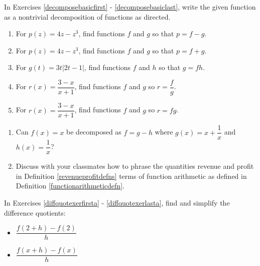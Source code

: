 In Exercises \ref{decomposebasicfirst} - \ref{decomposebasiclast}, write the given function as a nontrivial decomposition of functions as directed.

\begin{enumerate}
\setcounter{enumi}{\value{HW}}

\item  For $p(z) = 4z-z^3$, find functions $f$ and $g$ so that $p=f-g$. \label{decomposebasicfirst}
\item  For $p(z) = 4z-z^3$, find functions $f$ and $g$ so that $p=f+g$.
\item  For $g(t) = 3t|2t-1|$, find functions $f$ and $h$  so that $g = fh$.
\item  For $r(x) = \dfrac{3-x}{x+1}$, find functions $f$ and $g$ so $r = \dfrac{f}{g}$.
\item  For $r(x) = \dfrac{3-x}{x+1}$, find functions $f$ and $g$ so $r = fg$. \label{decomposebasiclast}

\setcounter{HW}{\value{enumi}}
\end{enumerate}

\begin{enumerate}
\setcounter{enumi}{\value{HW}}

\item    Can $f(x) = x$ be decomposed as $f = g-h$ where $g(x) = x+\dfrac{1}{x}$ and $h(x) = \dfrac{1}{x}$?

\item   Discuss with your classmates how to phrase the quantities revenue and profit in Definition \ref{revenueprofitdefns} terms of function arithmetic as defined in Definition \ref{functionarithmeticdefn}.
 
\setcounter{HW}{\value{enumi}}
\end{enumerate}

In Exercises \ref{diffquotexerfirsta} - \ref{diffquotexerlasta}, find and simplify the difference quotients:

\begin{multicols}{2}

\begin{itemize}

\item  $\dfrac{f(2+h) - f(2)}{h}$

\item  $\dfrac{f(x+h) - f(x)}{h}$

\end{itemize}

\end{multicols}


